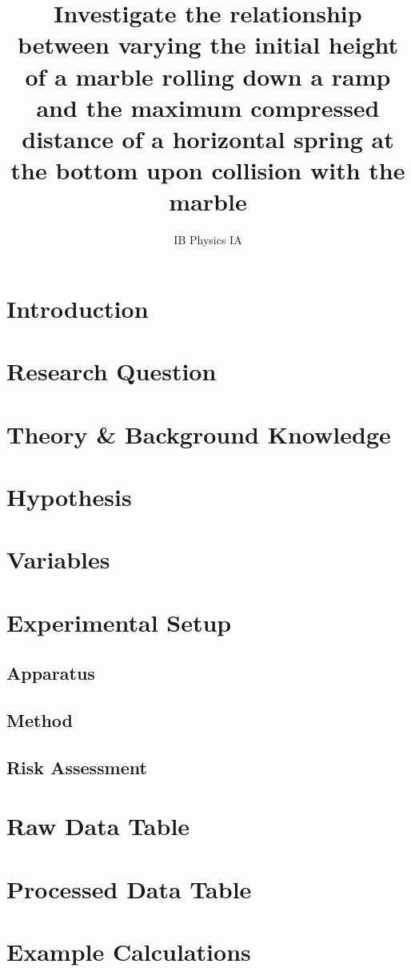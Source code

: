 \documentclass[11pt]{article}
\title{Investigate the relationship between varying the initial height of a marble rolling down
a ramp and the maximum compressed distance of a horizontal spring at the bottom
upon collision with the marble}
\date{IB Physics IA}
\begin{document}
    \maketitle
    \newpage
    \tableofcontents
    \newpage
    \section{Introduction}
    
    \section{Research Question}    
    
    \section{Theory \& Background Knowledge}
    
    \section{Hypothesis}
    
    \section{Variables}
    
    \section{Experimental Setup}
    
        \subsection{Apparatus}
        
        \subsection{Method}
        
        \subsection{Risk Assessment}
        
    \section{Raw Data Table}
    
    \section{Processed Data Table}
    
    \section{Example Calculations}
    
\end{document}

